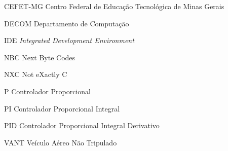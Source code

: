 %
%

\begin{siglas}
	\item[CEFET-MG] Centro Federal de Educação Tecnológica de Minas Gerais
    \item[DECOM] Departamento de Computação
    \item[IDE] \emph{Integrated Development Environment}
    \item[NBC] Next Byte Codes
    \item[NXC] Not eXactly C 
	\item[P] Controlador Proporcional
	\item[PI] Controlador Proporcional Integral	
	\item[PID] Controlador Proporcional Integral Derivativo
	\item[VANT] Veículo Aéreo Não Tripulado
\end{siglas}
